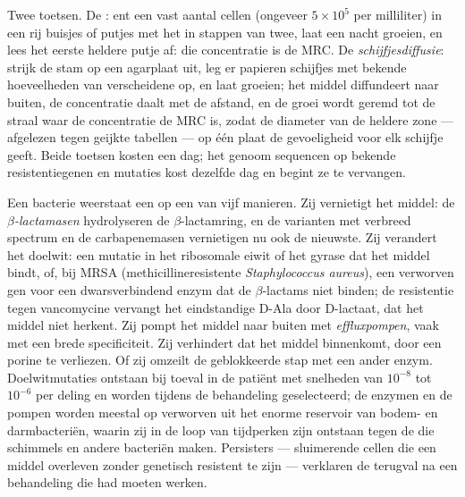 \begin{method}\label{met:b3:bacteriology:mic}
Twee toetsen. De \emph{}: ent een vast aantal cellen
(ongeveer $5\times 10^{5}$ per milliliter) in een rij buisjes of putjes
met het  in stappen van twee, laat een nacht groeien, en
lees het eerste heldere putje af: die concentratie is de MRC. De
\emph{schijfjesdiffusie}: strijk de stam op een agarplaat uit, leg er
papieren schijfjes met bekende hoeveelheden van verscheidene
 op, en laat groeien; het middel diffundeert naar buiten, de
concentratie daalt met de afstand, en de groei wordt geremd tot de
straal waar de concentratie de MRC is, zodat de diameter van de
heldere zone --- afgelezen tegen geijkte tabellen --- op één plaat de
gevoeligheid voor elk schijfje geeft. Beide toetsen kosten een dag; het
genoom sequencen op bekende resistentiegenen en mutaties kost dezelfde
dag en begint ze te vervangen.
\end{method}

\begin{definition}[Resistentie]\label{def:b3:bacteriology:resistance}
Een bacterie weerstaat een  op een van vijf manieren. Zij
vernietigt het middel: de \emph{$\beta$-lactamasen} hydrolyseren de
$\beta$-lactamring, en de varianten met verbreed spectrum en de
carbapenemasen vernietigen nu ook de nieuwste. Zij verandert het
doelwit: een mutatie in het ribosomale eiwit of het gyrase dat het
middel bindt, of, bij MRSA (methicillineresistente
\emph{Staphylococcus aureus}), een verworven gen voor een
dwarsverbindend enzym dat de $\beta$-lactams niet binden; de
resistentie tegen vancomycine vervangt het eindstandige D-Ala door
D-lactaat, dat het middel niet herkent. Zij pompt het middel naar
buiten met \emph{effluxpompen}, vaak met een brede specificiteit. Zij
verhindert dat het middel binnenkomt, door een porine te verliezen. Of
zij omzeilt de geblokkeerde stap met een ander enzym.
Doelwitmutaties ontstaan bij toeval in de patiënt met snelheden van
$10^{-8}$ tot $10^{-6}$ per deling en worden tijdens de behandeling
geselecteerd; de enzymen en de pompen worden meestal op 
verworven uit het enorme reservoir van bodem- en darmbacteriën, waarin
zij in de loop van tijdperken zijn ontstaan tegen de  die
schimmels en andere bacteriën maken. Persisters --- sluimerende cellen
die een middel overleven zonder genetisch resistent te zijn ---
verklaren de terugval na een behandeling die had moeten werken.
\end{definition}

